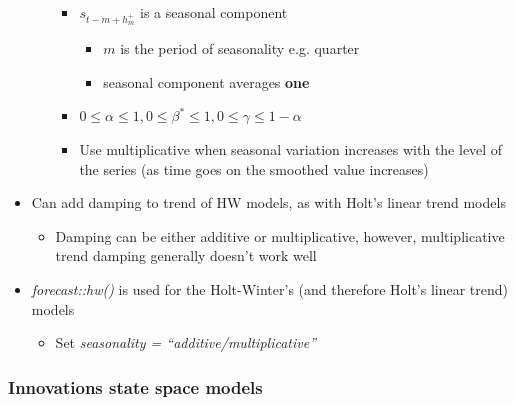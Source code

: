 \documentclass{article}\usepackage[]{graphicx}\usepackage[]{color}
\begin{document}
\begin{itemize}
\begin{enumerate}
\begin{itemize}
\begin{itemize}
            \end{itemize}
            \item $s_{t-m+h_m^+}$ is a seasonal component
            \begin{itemize}
                \item $m$ is the period of seasonality e.g. quarter
                \item seasonal component averages \textbf{one}
            \end{itemize}
            \item $0 \le \alpha \le 1, 0 \le \beta^* \le 1, 0 \le \gamma \le 1-\alpha$
            \item Use multiplicative when seasonal variation increases with the level of the series (as time goes on the smoothed value increases)
        \end{itemize}
    \end{enumerate}
    \item Can add damping to trend of HW models, as with Holt's linear trend models
    \begin{itemize}
        \item Damping can be either additive or multiplicative, however, multiplicative trend damping generally doesn't work well
    \end{itemize}
    \item \textit{forecast::hw()} is used for the Holt-Winter's (and therefore Holt's linear trend) models\
    \begin{itemize}
        \item Set \textit{seasonality = ``additive/multiplicative''}
    \end{itemize}
\end{itemize}

\subsubsection{ Innovations state space models}
\end{document}
